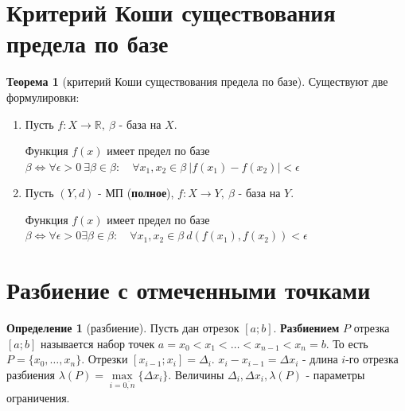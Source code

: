 \documentclass{report}
\theoremstyle{definition}
\newtheorem*{definition}{Определение}
\newtheorem*{theorem}{Теорема}
\begin{document}
\section{Критерий Коши существования предела по базе}

\begin{theorem}[критерий Коши существования предела по базе]
    Существуют две формулировки:
    \begin{enumerate}
        \item Пусть $f:X\rightarrow\mathbb{R}, \ \beta$ - база на $X$.

              Функция $f(x)$ имеет предел по базе $\beta \iff \forall \epsilon > 0 \ \exists\beta\in\beta: \quad \forall
                  x_{1},x_{2} \in \beta \ |f(x_{1}) - f(x_{2})| < \epsilon$

        \item Пусть $(Y,d)$ - МП (\textbf{полное}), $f:X\rightarrow Y, \ \beta$ - база на $Y$.

              Функция $f(x)$ имеет предел по базе $\beta \iff \forall \epsilon>0\exists\beta\in\beta: \quad \forall
                  x_{1},x_{2} \in \beta \ d(f(x_{1}), f(x_{2})) < \epsilon$
    \end{enumerate}
\end{theorem}

\section{Разбиение с отмеченными точками}

\begin{definition}[разбиение]
    Пусть дан отрезок $[a;b]$. \textbf{Разбиением} $P$ отрезка $[a;b]$ называется набор точек $a=x_{0}<x_{1}<\ldots
        <x_{n-1}<x_{n}=b$. То есть $P = \{x_{0},\ldots,x_{n}\}$. Отрезки $[x_{i-1};x_{i}] = \Delta_{i}$.
    $x_{i}-x_{i-1} = \Delta x_{i}$ - длина $i$-го отрезка разбиения $\lambda(P) = \underset{i=\overline{0,n}}
        {\max}\{\Delta x_{i}\}$. Величины $\Delta_{i}, \Delta x_{i}, \lambda(P)$ - параметры ограничения.
\end{definition}
\end{document}

